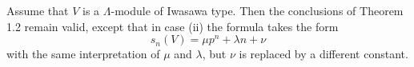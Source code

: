 Assume that $V$ is a $\Lambda$-module of Iwasawa type. Then the conclusions of Theorem 1.2 remain valid, except that in case (ii) the formula takes the form
$$s_n(V) = \mu p^n + \lambda n + \nu$$
with the same interpretation of $\mu$ and $\lambda$, but $\nu$ is replaced by a different constant.
